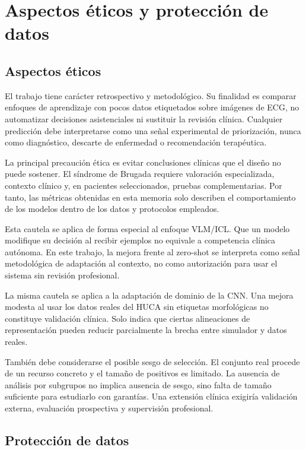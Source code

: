 \chapter{Aspectos éticos y protección de datos}
\label{chap:gestion_etica}

\section{Aspectos éticos}

El trabajo tiene carácter retrospectivo y metodológico. Su finalidad es comparar enfoques de aprendizaje con pocos datos etiquetados sobre imágenes de ECG, no automatizar decisiones asistenciales ni sustituir la revisión clínica. Cualquier predicción debe interpretarse como una señal experimental de priorización, nunca como diagnóstico, descarte de enfermedad o recomendación terapéutica.

La principal precaución ética es evitar conclusiones clínicas que el diseño no puede sostener. El síndrome de Brugada requiere valoración especializada, contexto clínico y, en pacientes seleccionados, pruebas complementarias. Por tanto, las métricas obtenidas en esta memoria solo describen el comportamiento de los modelos dentro de los datos y protocolos empleados.

Esta cautela se aplica de forma especial al enfoque VLM/ICL. Que un modelo modifique su decisión al recibir ejemplos no equivale a competencia clínica autónoma. En este trabajo, la mejora frente al zero-shot se interpreta como señal metodológica de adaptación al contexto, no como autorización para usar el sistema sin revisión profesional.

La misma cautela se aplica a la adaptación de dominio de la CNN. Una mejora modesta al usar los datos reales del HUCA sin etiquetas morfológicas no constituye validación clínica. Solo indica que ciertas alineaciones de representación pueden reducir parcialmente la brecha entre simulador y datos reales.

También debe considerarse el posible sesgo de selección. El conjunto real procede de un recurso concreto y el tamaño de positivos es limitado. La ausencia de análisis por subgrupos no implica ausencia de sesgo, sino falta de tamaño suficiente para estudiarlo con garantías. Una extensión clínica exigiría validación externa, evaluación prospectiva y supervisión profesional.

\section{Protección de datos}


